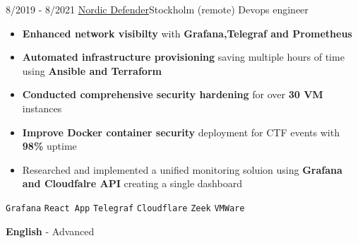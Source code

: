 \documentclass[9pt]{developercv} %
\begin{document}
\begin{center}
\end{center}
\vspace{5pt}
\begin{entrylist}
    \entry
    {8/2019 - 8/2021}
    {\href{https://nordicdefender.com/}{Nordic Defender}\newline\small\textnormal{Stockholm (remote)}}
    {Devops engineer}
    {\vspace{-6pt}
        \begin{itemize}[itemsep=2pt,topsep=0pt,parsep=0pt,partopsep=0pt, leftmargin=-1pt]
            \item{\textbf{Enhanced network visibilty} with \textbf{Grafana,Telegraf and Prometheus}}
            \item{\textbf{Automated infrastructure provisioning} saving multiple hours of time using \textbf{Ansible and Terraform}}
            \item{\textbf{Conducted comprehensive security hardening} for over \textbf{30 VM} instances}
            \item{\textbf{Improve Docker container security} deployment for CTF events with \textbf{98\%} uptime}
            \item{Researched and implemented a unified monitoring soluion using \textbf{Grafana and Cloudfalre API} creating a single dashboard}
        \end{itemize}
        \texttt{Grafana} \slashsep \texttt{React App} \slashsep \texttt{Telegraf} \slashsep \texttt{Cloudflare} \slashsep \texttt{Zeek} \slashsep \texttt{VMWare}}
\end{entrylist}
\vspace{-10 pt}
\vspace{-6pt}

\hspace{26mm} \textbf{English} - Advanced

\end{document}

